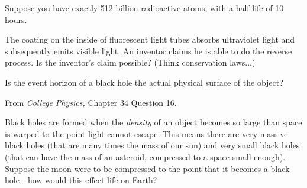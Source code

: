 \documentclass[12pt]{exam}
\begin{document}
\begin{questions}
\clearpage
\question Suppose you have exactly 512 billion radioactive atoms, with a half-life of 10 hours.
	
\question The coating on the inside of fluorescent light tubes absorbs ultraviolet light and subsequently emits visible light. An inventor claims he is able to do the reverse process. Is the inventor's claim possible? (Think conservation laws...)
	\vspace{1in}

\question Is the event horizon of a black hole the actual physical surface of the object?

From \textit{College Physics,} Chapter 34 Question 16.
\vspace{1in}

\clearpage
\question Black holes are formed when the \textit{density} of an object becomes so large than space is warped to the point light cannot escape: This means there are very massive black holes (that are many times the mass of our sun) and very small black holes (that can have the mass of an asteroid, compressed to a space small enough). Suppose the moon were to be compressed to the point that it becomes a black hole - how would this effect life on Earth?
\vspace{1in}


\end{questions}
\end{document}
